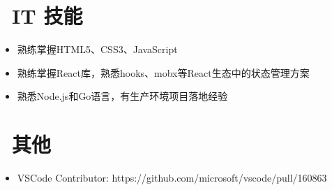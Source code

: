 \documentclass{resume}
\begin{document}

\section{\faCogs\ IT 技能}
\begin{itemize}[parsep=0.5ex]
  \item 熟练掌握HTML5、CSS3、JavaScript
  \item 熟练掌握React库，熟悉hooks、mobx等React生态中的状态管理方案
  \item 熟悉Node.js和Go语言，有生产环境项目落地经验
\end{itemize}


\section{\faInfo\ 其他}
\begin{itemize}[parsep=0.5ex]
  \item VSCode Contributor: https://github.com/microsoft/vscode/pull/160863
\end{itemize}

%
%
\end{document}
